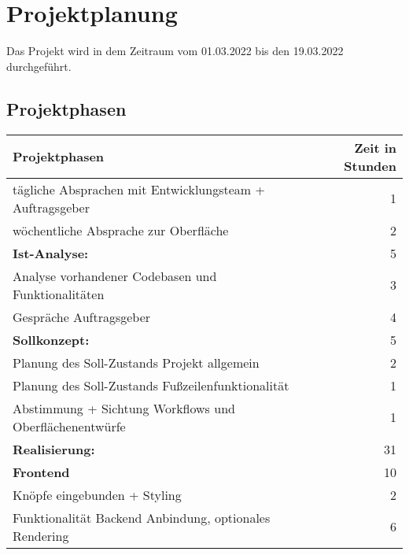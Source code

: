 \newpage
\section{Projektplanung}
\label{projektplanung}
Das Projekt wird in dem Zeitraum vom 01.03.2022 bis den 19.03.2022 durchgeführt. %

\subsection{Projektphasen}
\label{projektphasen}

{
\begin{tabular}{|l|r|}
	\hline
	\textbf{Projektphasen }                                  & \textbf{Zeit in Stunden} \\ \hline
	tägliche Absprachen mit Entwicklungsteam + Auftragsgeber &                        1 \\
	wöchentliche Absprache zur Oberfläche                    &                        2 \\
	\textbf{Ist-Analyse: }                                   &                        5 \\
	Analyse vorhandener Codebasen und Funktionalitäten       &                        3 \\
	Gespräche Auftragsgeber                                  &                        4 \\
	\textbf{Sollkonzept:  }                                  &                        5 \\
	Planung des Soll-Zustands Projekt allgemein              &                        2 \\
	Planung des Soll-Zustands Fußzeilenfunktionalität        &                        1 \\
	Abstimmung + Sichtung Workflows und Oberflächenentwürfe  &                        1 \\
	\textbf{Realisierung: }                                  &                       31 \\
	\textbf{Frontend  }                                      &                       10 \\
	Knöpfe eingebunden + Styling                             &                        2 \\
	Funktionalität Backend Anbindung, optionales Rendering   &                        6 \\

\end{tabular}}
